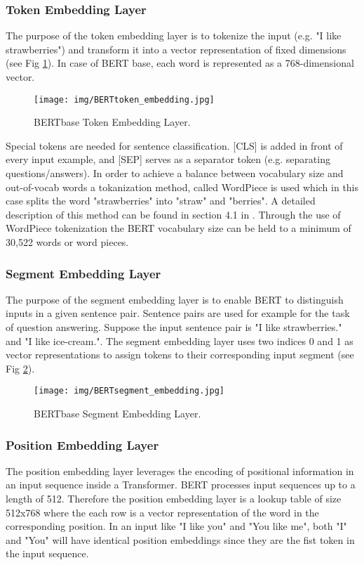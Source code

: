 \subsubsection{Token Embedding Layer}
The purpose of the token embedding layer is to tokenize the input (e.g. "I like strawberries") and transform it into a vector representation of fixed dimensions (see Fig \ref{fig:BERT_tokenEmbedding}). In case of BERT base, each word is represented as a 768-dimensional vector.
\begin{figure}
    \centering
    \texttt{[image: img/BERTtoken\_embedding.jpg]}
    \caption{BERTbase Token Embedding Layer.}
    \label{fig:BERT_tokenEmbedding}
\end{figure}
Special tokens are needed for sentence classification. [CLS] is added in front of every input example, and [SEP] serves as a separator token (e.g. separating questions/answers).
In order to achieve a balance between vocabulary size and out-of-vocab words a tokanization method, called WordPiece is used which in this case splits the word "strawberries" into "straw" and "berries". A detailed description of this method can be found in section 4.1 in \cite{wu2016google}.  Through the use of WordPiece tokenization the BERT vocabulary size can be held to a minimum of 30,522 words or word pieces. 
\subsubsection{Segment Embedding Layer}
The purpose of the segment embedding layer is to enable BERT to distinguish inputs in a given sentence pair. Sentence pairs are used for example for the task of question answering. Suppose the input sentence pair is "I like strawberries." and "I like ice-cream.". The segment embedding layer uses two indices 0 and 1 as vector representations to assign tokens to their corresponding input segment (see Fig \ref{fig:BERT_segmentEmbedding}).

\begin{figure}
    \centering
    \texttt{[image: img/BERTsegment\_embedding.jpg]}
    \caption{BERTbase Segment Embedding Layer.}
    \label{fig:BERT_segmentEmbedding}
\end{figure}

\subsubsection{Position Embedding Layer}
The position embedding layer leverages the encoding of positional information in an input sequence inside a Transformer. BERT processes input sequences up to a length of 512. Therefore the position embedding layer is a lookup table of size 512x768 where the each row is a vector representation of the word in the corresponding position. In an input like "I like you" and "You like me", both "I" and "You" will have identical position embeddings since they are the fist token in the input sequence. 

